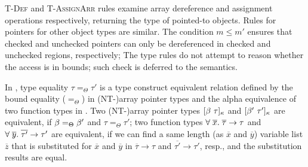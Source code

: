 %
\textsc{T-Def} and \textsc{T-AssignArr} rules examine array
dereference and assignment operations respectively, returning the type of
pointed-to objects. Rules for pointers for other object types are
similar.
The condition $m\le m'$ ensures that checked and unchecked pointers 
can only be dereferenced in checked and unchecked regions, respectively;
The type rules do not attempt to reason whether the access is in bounds;
such check is deferred to the semantics.

%
In \lang, type equality $\tau=_{\Theta}\tau'$
is a type construct equivalent relation defined by the bound equality ($=_{\Theta}$) in (NT-)array pointer types
and the alpha equivalence of two function types in .
Two (NT-)array pointer types $[{\beta}~{\tau}]_{\kappa} $ and $ [{\beta'}~{\tau'}]_{\kappa}$ are equivalent, if 
$\beta =_{\Theta} \beta'$ and $\tau=_{\Theta}\tau'$; two function types 
$\forall \;\overline{x}.\;{\overline{\tau}}\to\tau $ and $ \forall \;\overline{y}.\;{\overline{\tau'}}\to\tau'$
are equivalent, if we can find a same length (as $\overline{x}$ and $\overline{y}$) variable list $\overline{z}$ that is substituted for $\overline{x}$ and $\overline{y}$ in $\overline{\tau} \to {\tau}$ and $\overline{\tau'} \to {\tau'}$, resp.,
and the substitution results are equal.

